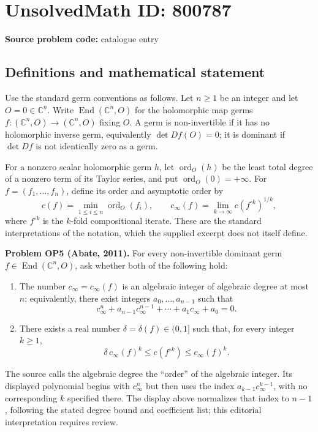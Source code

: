 \documentclass[11pt]{article}
\newcommand{\C}{\mathbb{C}}
\begin{document}
\section*{UnsolvedMath ID: 800787}
\textbf{Source problem code:} catalogue entry
\subsection{Definitions and mathematical statement}
Use the standard germ conventions as follows. Let \(n\geq 1\) be an integer and let \(O=0\in\C^n\). Write \(\operatorname{End}(\C^n,O)\) for the holomorphic map germs \(f:(\C^n,O)\to(\C^n,O)\) fixing \(O\). A germ is non-invertible if it has no holomorphic inverse germ, equivalently \(\det Df(O)=0\); it is dominant if \(\det Df\) is not identically zero as a germ.

For a nonzero scalar holomorphic germ \(h\), let \(\operatorname{ord}_O(h)\) be the least total degree of a nonzero term of its Taylor series, and put \(\operatorname{ord}_O(0)=+\infty\). For \(f=(f_1,\ldots,f_n)\), define its order and asymptotic order by
\[
 c(f)=\min_{1\leq i\leq n}\operatorname{ord}_O(f_i),
 \qquad
 c_\infty(f)=\lim_{k\to\infty}c(f^{\circ k})^{1/k},
\]
where \(f^{\circ k}\) is the \(k\)-fold compositional iterate. These are the standard interpretations of the notation, which the supplied excerpt does not itself define.

\textbf{Problem OP5 (Abate, 2011).} For every non-invertible dominant germ \(f\in\operatorname{End}(\C^n,O)\), ask whether both of the following hold:
\begin{enumerate}
\item The number \(c_\infty=c_\infty(f)\) is an algebraic integer of algebraic degree at most \(n\); equivalently, there exist integers \(a_0,\ldots,a_{n-1}\) such that
\[
 c_\infty^n+a_{n-1}c_\infty^{n-1}+\cdots+a_1c_\infty+a_0=0.
\]
\item There exists a real number \(\delta=\delta(f)\in(0,1]\) such that, for every integer \(k\geq1\),
\[
 \delta\,c_\infty(f)^k\leq c(f^{\circ k})\leq c_\infty(f)^k.
\]
\end{enumerate}
The source calls the algebraic degree the ``order'' of the algebraic integer. Its displayed polynomial begins with \(c_\infty^n\) but then uses the index \(a_{k-1}c_\infty^{k-1}\), with no corresponding \(k\) specified there. The display above normalizes that index to \(n-1\), following the stated degree bound and coefficient list; this editorial interpretation requires review.
\end{document}
